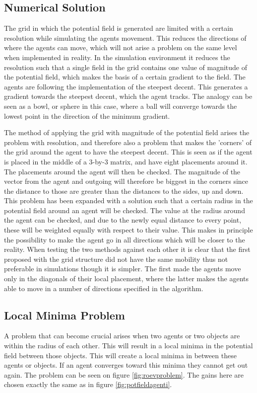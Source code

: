 \subsection{Numerical Solution}
\label{subsec:numsol}
The grid in which the potential field is generated are limited with a
certain resolution while simulating the agents movement. This reduces
the directions of where the agents can move, which will not arise a
problem on the same level when implemented in reality. In the
simulation environment it reduces the resolution such that a single
field in the grid contains one value of magnitude of the potential
field, which makes the basis of a certain gradient to the field. The
agents are following the implementation of the steepest decent. This
generates a gradient towards the steepest decent, which the agent
tracks. The analogy can be seen as a bowl, or sphere in this case,
where a ball will converge towards the lowest point in the direction
of the minimum gradient.

The method of applying the grid with magnitude of the potential field
arises the problem with resolution, and therefore also a problem that makes the
'corners' of the grid around the agent to have the
steepest decent. This is seen as if the agent is placed in the middle
of a 3-by-3 matrix, and have eight placements around it. The placements around the agent will then be checked. The magnitude of the vector from the agent and outgoing will therefore be biggest in the corners since the distance to those are greater than the distances to the sides, up and down. This problem
has been expanded with a solution such that a certain radius in the
potential field around an agent will be checked. The value at the
radius around the agent can be checked, and due to the newly equal distance
to every point, these will be weighted equally with respect to their
value. This makes in principle the possibility to make the agent go in
all directions which will be closer to the reality. When testing the
two methods against each other it is clear that the first proposed
with the grid structure did not have the same mobility thus not
preferable in simulations though it is simpler. The first made the agents move only in the diagonals of their local placement, where the latter makes the agents able to move in a number of directions specified in the algorithm.

\subsection{Local Minima Problem}
A problem that can become crucial arises when two agents or two
objects are within the radius of each other. This will result in a
local minima in the potential field between those objects. This will
create a local minima in between these agents or objects. If an
agent converges toward this minima they cannot get out again. The
problem can be seen on figure \ref{fig:roevproblem}. The gains here
are chosen exactly the same as in figure \ref{fig:potfieldagenti}.

